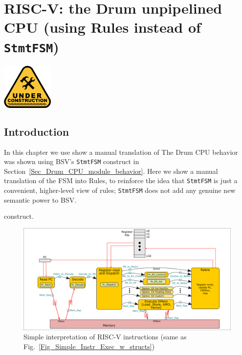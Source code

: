 

\chapter{RISC-V: the Drum unpipelined CPU (using Rules instead of {\tt StmtFSM})}


\setcounter{page}{1}
\renewcommand{\thepage}{\arabic{chapter}-\arabic{page}}

\label{ch_Drum_Rules}


\vspace{2ex}

\centerline{\includegraphics[width=1in,angle=0]{Figures/Fig_Under_Construction}}

\vspace{2ex}

\section{Introduction}

In this chapter we use show a manual translation of The Drum CPU
behavior was shown using BSV's \verb|StmtFSM| construct in
Section~\ref{Sec_Drum_CPU_module_behavior}.  Here we show a manual
translation of the FSM into Rules, to reinforce the idea that
\verb|StmtFSM| is just a convenient, higher-level view of rules;
\verb|StmtFSM| does not add any genuine new semantic power to BSV.

construct.
\begin{figure}[htbp]
  \centerline{\includegraphics[width=6in,angle=0]{Figures/Fig_Instr_Exec_w_structs}}
  \caption{\label{Fig_Drum_II_Instr_Exec}
           Simple interpretation of RISC-V instructions
	   (same as Fig.~\ref{Fig_Simple_Instr_Exec_w_structs})}
\end{figure}

